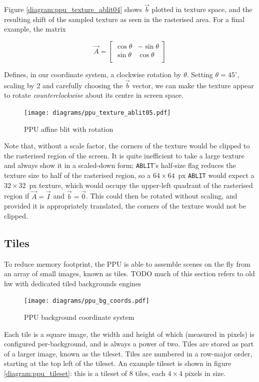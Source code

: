 Figure \ref{diagram:ppu_texture_ablit04} shows $\vec{b}$ plotted in texture space, and the resulting shift of the sampled texture as seen in the rasterised area. For a final example, the matrix

\[
\vec{A} = \begin{bmatrix}
\cos\theta & -\sin\theta \\
\sin\theta & \cos\theta \\
\end{bmatrix}
\]

Defines, in our coordinate system, a clockwise rotation by $\theta$. Setting $\theta=45^{\circ}$, scaling by 2 and carefully choosing the $\vec{b}$ vector, we can make the texture appear to rotate {\it counterclockwise} about its centre in screen space.

\begin{figure}[H]
\centering
\caption{PPU affine blit with rotation}
\label{diagram:ppu_texture_ablit05}
\texttt{[image: diagrams/ppu\_texture\_ablit05.pdf]}
\end{figure}

Note that, without a scale factor, the corners of the texture would be clipped to the rasterised region of the screen. It is quite inefficient to take a large texture and always show it in a scaled-down form; {\tt ABLIT}'s half-size flag reduces the texture size to half of the rasterised region, so a $64\times 64$~px {\tt ABLIT} would expect a $32\times 32$~px texture, which would occupy the upper-left quadrant of the rasterised region if $\vec{A}=\vec{I}$ and $\vec{b}=\vec{0}$. This could then be rotated without scaling, and provided it is appropriately translated, the corners of the texture would not be clipped.

\subsection{Tiles}
\label{section:tiles}

To reduce memory footprint, the PPU is able to assemble scenes on the fly from an array of small images, known as tiles. TODO much of this section refers to old hw with dedicated tiled backgrounds engines

\begin{figure}[H]
\centering
\caption{PPU background coordinate system}
\label{diagram:ppu_bg_coords}
\texttt{[image: diagrams/ppu\_bg\_coords.pdf]}
\end{figure}

Each tile is a square image, the width and height of which (measured in pixels) is configured per-background, and is always a power of two. Tiles are stored as part of a larger image, known as the tileset. Tiles are numbered in a row-major order, starting at the top left of the tileset. An example tileset is shown in figure \ref{diagram:ppu_tileset}: this is a tileset of 8 tiles, each $4\times 4$ pixels in size.

